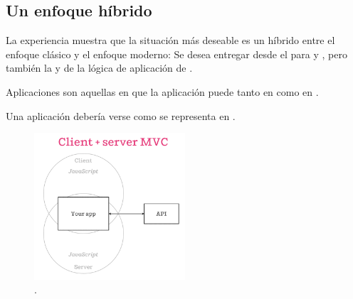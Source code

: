 \begin{itemize}
\end{itemize}


\subsection{Un enfoque híbrido}

La experiencia muestra que la situación más deseable es un híbrido entre el enfoque clásico y el enfoque moderno: Se desea entregar \htmlNAME \fullyFormedCPT desde el \serverAS para \performanceQA y \seoINT, pero también la \speedQA y \flexibilityQA de la lógica de aplicación de \clientSideAS.

Aplicaciones \isomorphicAS \javaScriptNAME son aquellas en que la aplicación \javaScriptNAME puede \runCPT tanto en \clientSideAS como en \serverSideAS.

Una aplicación \isomorphicAS debería verse como se representa en .

\begin{figure}[H]
	\centering
	\includegraphics[width=0.5\textwidth]{figuras/estadoArte/isomorphic-client-server-mvc.png}
	\caption{\isomorphicAS  \clientAS \serverAS \mvcAS.}
	\label{figure:isomorphic_client_server_mvc}
\end{figure}

